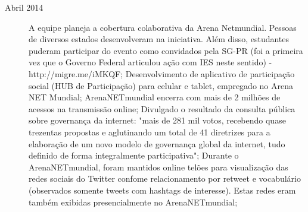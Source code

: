 \documentclass{article}
\begin{document}
\begin{description}
%
%
%

  \item [Abril 2014]
  A equipe planeja a cobertura colaborativa da Arena Netmundial. Pessoas de diversos estados desenvolveram na iniciativa. Além disso, estudantes puderam participar do evento como convidados pela SG-PR (foi a primeira vez que o Governo Federal articulou ação com IES neste sentido) -  http://migre.me/iMKQF;
  Desenvolvimento de aplicativo de participação social (HUB de Participação) para celular e tablet, empregado no Arena NET Mundial;
  ArenaNETmundial encerra com mais de 2 milhões de acessos na transmissão online;
  Divulgado o resultado da consulta pública sobre governança da internet:  "mais de 281 mil votos, recebendo quase trezentas propostas e aglutinando um total de 41 diretrizes para a elaboração de um novo modelo de governança global da internet, tudo definido de forma integralmente participativa";
  Durante o ArenaNETmundial, foram mantidos online  telões para visualização das redes sociais do Twitter confome relacionamento por retweet e vocabulário (observados somente tweets com hashtags de interesse). Estas redes eram também exibidas presencialmente no ArenaNETmundial;


\end{description}
\end{document}

